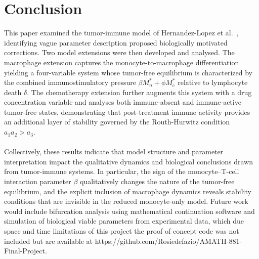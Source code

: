 \documentclass[11pt]{article}
\theoremstyle{definition}
\begin{document}
\section{Conclusion}

This paper examined the tumor-immune model of Hernandez-Lopez et
al.\ \parencite{ERX2026}, identifying vague parameter description proposed biologically motivated corrections. Two
model extensions were then developed and analysed. The macrophage extension
captures the monocyte-to-macrophage differentiation  yielding a
four-variable system whose tumor-free equilibrium is characterized by the
combined immunostimulatory pressure $\beta M_n^* + \phi M_c^*$ relative to
lymphocyte death $\delta$. The chemotherapy extension further augments this
system with a drug concentration variable and analyses both immune-absent and
immune-active tumor-free states, demonstrating that post-treatment immune
activity provides an additional layer of stability governed by the
Routh-Hurwitz condition $a_1 a_2 > a_3$.
\\
\\
Collectively, these results indicate that model structure and parameter
interpretation impact the qualitative dynamics and
biological conclusions drawn from tumor-immune systems. In particular, the
sign of the monocyte--T-cell interaction parameter $\beta$ qualitatively
changes the nature of the tumor-free equilibrium, and the explicit inclusion
of macrophage dynamics reveals stability conditions that are invisible in
the reduced monocyte-only model. Future work would include bifurcation analysis 
using mathematical continuation software and simulation of biological viable parameters 
from experimental data, which due space and time limitations of this project the proof of 
concept code was not included but are available at https://github.com/Rosiedefazio/AMATH-881-Final-Project.

\newpage
\printbibliography
\end{document}

